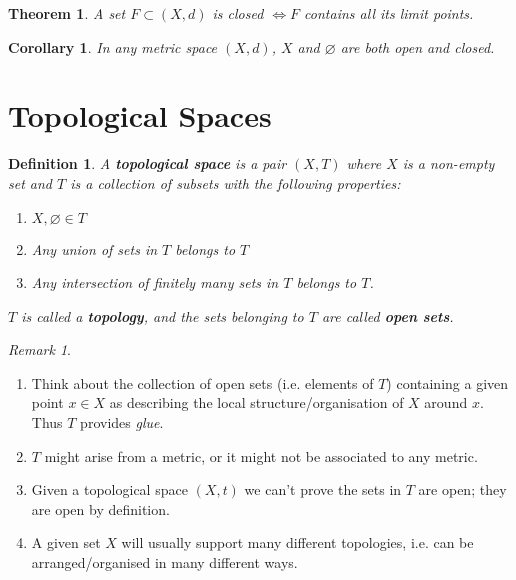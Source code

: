 \documentclass{article}
\renewcommand{\emptyset}{\varnothing}
\newtheorem{theorem}{Theorem}[section]
\newtheorem{corollary}{Corollary}[theorem]
\newtheorem{sdefinition}[stheorem]{Definition}
\theoremstyle{remark}
\theoremstyle{example}
\theoremstyle{examples}
\newtheorem*{remark}{Remark}
\begin{document}
	\begin{theorem}
		A set $F \subset (X,d)$ is closed $\iff F$ contains all its limit points.
	\end{theorem}

	\begin{corollary}
		In any metric space $(X,d)$, $X$ and $\varnothing$ are both open and closed.
	\end{corollary}
	\pagebreak

	\section{Topological Spaces}
	\addtocounter{theorem}{1}
	\begin{sdefinition}
		\label{topologicalspace}
		A \textbf{topological space} is a pair $(X,T)$ where $X$ is a non-empty set and $T$ is a collection of subsets with the following properties:
		\begin{enumerate}
			\item $X, \emptyset \in T$
			\item Any union of sets in $T$ belongs to $T$
			\item Any intersection of finitely many sets in $T$ belongs to $T$.
		\end{enumerate}
		$T$ is called a \textbf{topology}, and the sets belonging to $T$ are called \textbf{open sets}.
	\end{sdefinition}

	\begin{remark}\ 
		\begin{enumerate}
			\item Think about the collection of open sets (i.e. elements of $T$) containing a given point $x \in X$ as describing the local structure/organisation of $X$ around $x$. Thus $T$ provides \textit{glue}.
			\item $T$ might arise from a metric, or it might not be associated to any metric.
			\item Given a topological space $(X,t)$ we can't prove the sets in $T$ are open; they are open by definition.
			\item A given set $X$ will usually support many different topologies, i.e. can be arranged/organised in many different ways.
		\end{enumerate}
	\end{remark}
\end{document}
